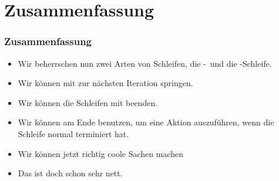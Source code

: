 \documentclass[aspectratio=169,mathserif,notheorems]{beamer}%
\begin{document}
\section{Zusammenfassung}%
%
\begin{frame}%
\frametitle{Zusammenfassung}%
\begin{itemize}%
\item Wir beherrschen nun zwei Arten von Schleifen, die -\ und die -Schleife.%
%
\item<2-> Wir können mit  zur nächsten Iteration springen.%
%
\item<3-> Wir können die Schleifen mit  beenden.%
%
\item<4-> Wir können  am Ende benutzen, um eine Aktion auszuführen, wenn die Schleife normal terminiert hat.%
%
\item<5-> Wir können jetzt richtig coole Sachen machen%
\item<8-> Das ist doch schon sehr nett.%
\end{itemize}%
\end{frame}%
%
\endPresentation%
\end{document}
